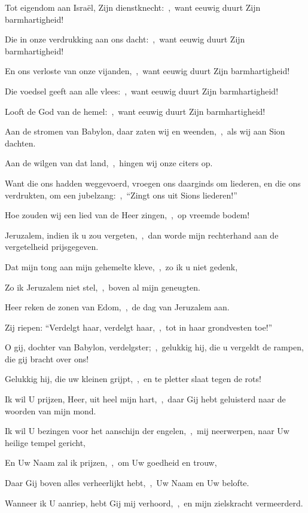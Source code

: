 \documentclass[12pt,twoside,a5paper]{article}
\begin{document}
\begin{halfparskip}
  Tot eigendom aan Israël, Zijn dienstknecht:~\sep\ want eeuwig duurt Zijn barmhartigheid!

  Die in onze verdrukking aan ons dacht:~\sep\ want eeuwig duurt Zijn barmhartigheid!

  En ons verloste van onze vijanden,~\sep\ want eeuwig duurt Zijn barmhartigheid!

  Die voedsel geeft aan alle vlees:~\sep\ want eeuwig duurt Zijn barmhartigheid!

  Looft de God van de hemel:~\sep\ want eeuwig duurt Zijn barmhartigheid!

   Aan de stromen van Babylon, daar zaten wij en weenden,~\sep\ als wij aan Sion dachten.

  Aan de wilgen van dat land,~\sep\ hingen wij onze citers op.

  Want die ons hadden weggevoerd, vroegen ons daarginds om liederen, en die ons verdrukten, om een jubelzang:~\sep\ ``Zingt ons uit Sions liederen!''

  Hoe zouden wij een lied van de Heer zingen,~\sep\ op vreemde bodem!

  Jeruzalem, indien ik u zou vergeten,~\sep\ dan worde mijn rechterhand aan de vergetelheid prijsgegeven.

  Dat mijn tong aan mijn gehemelte kleve,~\sep\ zo ik u niet gedenk,

  Zo ik Jeruzalem niet stel,~\sep\ boven al mijn geneugten.

  Heer reken de zonen van Edom,~\sep\ de dag van Jeruzalem aan.

  Zij riepen: ``Verdelgt haar, verdelgt haar,~\sep\ tot in haar grondvesten toe!''

  O gij, dochter van Babylon, verdelgster;~\sep\ gelukkig hij, die u vergeldt de rampen, die gij bracht over ons!

  Gelukkig hij, die uw kleinen grijpt,~\sep\ en te pletter slaat tegen de rots!

   Ik wil U prijzen, Heer, uit heel mijn hart,~\sep\ daar Gij hebt geluisterd naar de woorden van mijn mond.

  Ik wil U bezingen voor het aanschijn der engelen,~\sep\ mij neerwerpen, naar Uw heilige tempel gericht,

  En Uw Naam zal ik prijzen,~\sep\ om Uw goedheid en trouw,

  Daar Gij boven alles verheerlijkt hebt,~\sep\ Uw Naam en Uw belofte.

  Wanneer ik U aanriep, hebt Gij mij verhoord,~\sep\ en mijn zielskracht vermeerderd.


\end{halfparskip}
\end{document}
